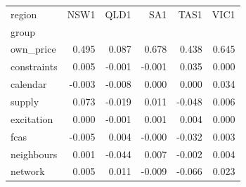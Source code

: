 \begin{tabular}{lrrrrr}
\toprule
region & NSW1 & QLD1 & SA1 & TAS1 & VIC1 \\
group & & & & & \\
\midrule
own\_price & 0.495 & 0.087 & 0.678 & 0.438 & 0.645 \\
constraints & 0.005 & -0.001 & -0.001 & 0.035 & 0.000 \\
calendar & -0.003 & -0.008 & 0.000 & 0.000 & 0.034 \\
supply & 0.073 & -0.019 & 0.011 & -0.048 & 0.006 \\
excitation & 0.000 & -0.001 & 0.001 & 0.004 & 0.000 \\
fcas & -0.005 & 0.004 & -0.000 & -0.032 & 0.003 \\
neighbours & 0.001 & -0.044 & 0.007 & -0.002 & 0.004 \\
network & 0.005 & 0.011 & -0.009 & -0.066 & 0.023 \\
\bottomrule
\end{tabular}